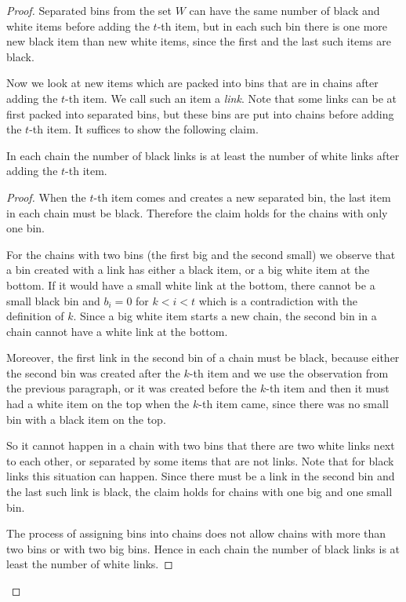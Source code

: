 \documentclass[11pt,a4paper]{article}
\begin{document}
\begin{proof}
Separated bins from the set $W$ can have the same number of black and white items before adding the $t$-th item,
but in each such bin there is one more new black item than new white items,
since the first and the last such items are black.

Now we look at new items which are packed into bins that are in chains after adding the $t$-th item.
We call such an item a \textit{link}.
Note that some links can be at first packed into separated bins, but these bins are put into chains before adding the $t$-th item.
It suffices to show the following claim. 

\begin{claim}
In each chain the number of black links is at least the number of white links after adding the $t$-th item.
\end{claim}

\begin{proof}

When the $t$-th item comes and creates a new separated bin, the last item in each chain must be black.
Therefore the claim holds for the chains with only one bin.

For the chains with two bins (the first big and the second small) we observe 
that a bin created with a link has either a black item, or a big white item at the bottom.
If it would have a small white link at the bottom, there cannot be a small black bin and $b_i = 0$ for $k < i < t$
which is a contradiction with the definition of $k$.
Since a big white item starts a new chain, the second bin in a chain cannot have a white link at the bottom.

Moreover, the first link in the second bin of a chain must be black,
because either the second bin was created after the $k$-th item and we use the observation from the previous paragraph,
or it was created before the $k$-th item and then it must had a white item on the top when the $k$-th item came,
since there was no small bin with a black item on the top.

So it cannot happen in a chain with two bins that there are two white links next to each other,
or separated by some items that are not links.
Note that for black links this situation can happen.
Since there must be a link in the second bin and the last such link is black,
the claim holds for chains with one big and one small bin.

The process of assigning bins into chains does not allow chains with more than two bins or with two big bins.
Hence in each chain the number of black links is at least the number of white links.
\end{proof}


\end{proof}
\end{document}
